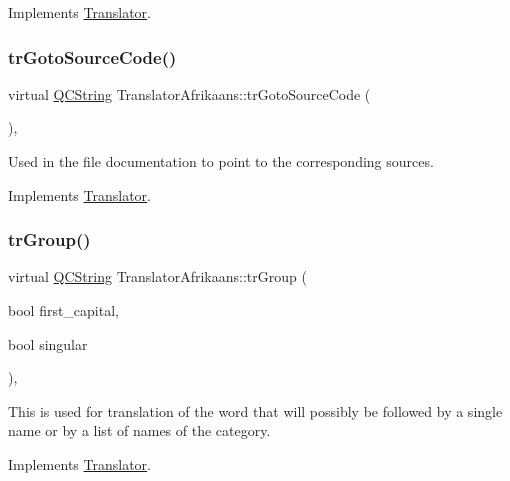 Implements \mbox{\hyperlink{class_translator}{Translator}}.

\mbox{\label{class_translator_afrikaans_af738a17dec637d5820175b47b50322fb}} 
\subsubsection{\texorpdfstring{trGotoSourceCode()}{trGotoSourceCode()}}
{\footnotesize\ttfamily virtual \mbox{\hyperlink{class_q_c_string}{Q\+C\+String}} Translator\+Afrikaans\+::tr\+Goto\+Source\+Code (\begin{DoxyParamCaption}{ }\end{DoxyParamCaption})\hspace{0.3cm}{\ttfamily [inline]}, {\ttfamily [virtual]}}

Used in the file documentation to point to the corresponding sources. 

Implements \mbox{\hyperlink{class_translator}{Translator}}.

\mbox{\label{class_translator_afrikaans_a8e885a398d7eb21214e6007fd9e01599}} 
\subsubsection{\texorpdfstring{trGroup()}{trGroup()}}
{\footnotesize\ttfamily virtual \mbox{\hyperlink{class_q_c_string}{Q\+C\+String}} Translator\+Afrikaans\+::tr\+Group (\begin{DoxyParamCaption}\item[{bool}]{first\+\_\+capital,  }\item[{bool}]{singular }\end{DoxyParamCaption})\hspace{0.3cm}{\ttfamily [inline]}, {\ttfamily [virtual]}}

This is used for translation of the word that will possibly be followed by a single name or by a list of names of the category. 

Implements \mbox{\hyperlink{class_translator}{Translator}}.

\mbox{\label{class_translator_afrikaans_a139c93120539a13d6b00792b3e8a6867}} 
